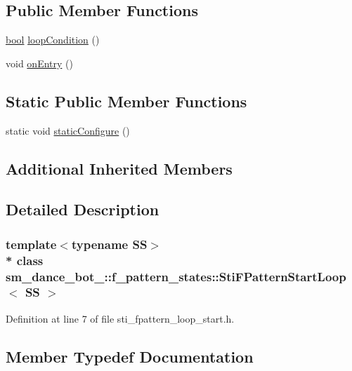 \subsection*{Public Member Functions}
\begin{DoxyCompactItemize}
\item 
\hyperlink{classbool}{bool} \hyperlink{structsm__dance__bot__3_1_1f__pattern__states_1_1StiFPatternStartLoop_a017db67346425df200acb8790e8ea62d}{loop\+Condition} ()
\item 
void \hyperlink{structsm__dance__bot__3_1_1f__pattern__states_1_1StiFPatternStartLoop_adeeae3cd11f3383b6d438d10690048de}{on\+Entry} ()
\end{DoxyCompactItemize}
\subsection*{Static Public Member Functions}
\begin{DoxyCompactItemize}
\item 
static void \hyperlink{structsm__dance__bot__3_1_1f__pattern__states_1_1StiFPatternStartLoop_a75a0e6b1069e3b876ab30cde65083a5d}{static\+Configure} ()
\end{DoxyCompactItemize}
\subsection*{Additional Inherited Members}


\subsection{Detailed Description}
\subsubsection*{template$<$typename SS$>$\\*
class sm\+\_\+dance\+\_\+bot\+\_\+::f\+\_\+pattern\+\_\+states\+::\+Sti\+F\+Pattern\+Start\+Loop$<$ S\+S $>$}



Definition at line 7 of file sti\+\_\+fpattern\+\_\+loop\+\_\+start.\+h.



\subsection{Member Typedef Documentation}
